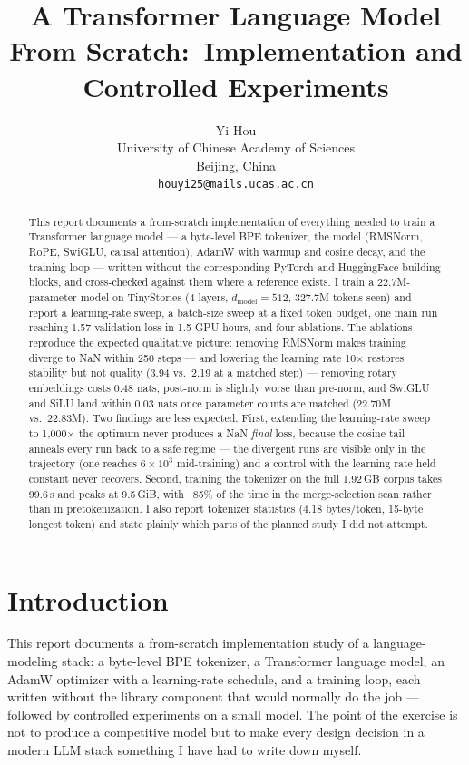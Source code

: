 \documentclass{article}
\title{A Transformer Language Model From Scratch:\ Implementation and Controlled Experiments}
\author{%
  Yi Hou \\
  University of Chinese Academy of Sciences\\
  Beijing, China \\
  \texttt{houyi25@mails.ucas.ac.cn} \\
}
\begin{document}
\maketitle

\begin{abstract}
This report documents a from-scratch implementation of everything needed to train a Transformer language model --- a byte-level BPE tokenizer, the model (RMSNorm, RoPE, SwiGLU, causal attention), AdamW with warmup and cosine decay, and the training loop --- written without the corresponding PyTorch and HuggingFace building blocks, and cross-checked against them where a reference exists. I train a 22.7M-parameter model on TinyStories (4 layers, $d_{\text{model}}{=}512$, 327.7M tokens seen) and report a learning-rate sweep, a batch-size sweep at a fixed token budget, one main run reaching 1.57 validation loss in 1.5 GPU-hours, and four ablations. The ablations reproduce the expected qualitative picture: removing RMSNorm makes training diverge to NaN within 250 steps --- and lowering the learning rate 10$\times$ restores stability but not quality (3.94 vs.\ 2.19 at a matched step) --- removing rotary embeddings costs 0.48 nats, post-norm is slightly worse than pre-norm, and SwiGLU and SiLU land within 0.03 nats once parameter counts are matched (22.70M vs.\ 22.83M). Two findings are less expected. First, extending the learning-rate sweep to 1{,}000$\times$ the optimum never produces a NaN \emph{final} loss, because the cosine tail anneals every run back to a safe regime --- the divergent runs are visible only in the trajectory (one reaches $6\!\times\!10^{3}$ mid-training) and a control with the learning rate held constant never recovers. Second, training the tokenizer on the full 1.92\,GB corpus takes 99.6\,s and peaks at 9.5\,GiB, with ~85\% of the time in the merge-selection scan rather than in pretokenization. I also report tokenizer statistics (4.18 bytes/token, 15-byte longest token) and state plainly which parts of the planned study I did not attempt.
\end{abstract}

\section{Introduction}
\label{sec:intro}

This report documents a from-scratch implementation study of a language-modeling stack: a byte-level BPE tokenizer, a Transformer language model, an AdamW optimizer with a learning-rate schedule, and a training loop, each written without the library component that would normally do the job --- followed by controlled experiments on a small model. The point of the exercise is not to produce a competitive model but to make every design decision in a modern LLM stack something I have had to write down myself.
\end{document}
